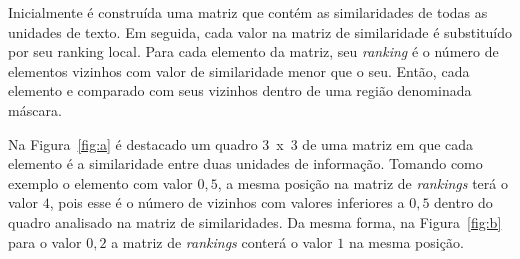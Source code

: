 Inicialmente é construída uma matriz que contém as similaridades de todas as unidades de texto. Em seguida, cada valor na matriz de similaridade é substituído por seu ranking local. Para cada elemento da matriz, seu \textit{ranking} é o número de elementos vizinhos com valor de similaridade menor que o seu.
Então, cada elemento e comparado com seus vizinhos dentro de uma região denominada máscara.
%

Na Figura~\ref{fig:a} é destacado um quadro 3~x~3 de uma matriz em que cada elemento é a similaridade entre duas unidades de informação. 
%
Tomando como exemplo o elemento com valor $0,5$, a mesma posição na matriz de \textit{rankings} terá o valor $4$, pois esse é o número de vizinhos com valores inferiores a $0,5$ dentro do quadro analisado na matriz de similaridades. Da mesma forma, na Figura~\ref{fig:b} para o valor $0,2$ a matriz de \textit{rankings} conterá o valor $1$ na mesma posição.











%
%
%
%
%
%
%
% 
%


% 
% 




